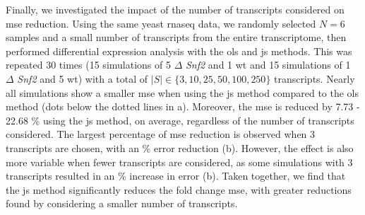 Finally, we investigated the impact of the number of transcripts considered on \gls{mse} reduction.
Using the same yeast \gls{rnaseq} data, we randomly selected $N = 6$ samples and a small number of transcripts from the entire transcriptome, then performed differential expression analysis with the \gls{ols} and \gls{js} methods.
This was repeated 30 times (15 simulations of 5 $\Delta$ \emph{Snf2} and 1 \gls{wt} and 15 simulations of 1 $\Delta$ \emph{Snf2} and 5 \gls{wt}) with a total of $|S| \in \{ 3, 10, 25, 50, 100, 250 \}$ transcripts.
Nearly all simulations show a smaller \gls{mse} when using the \gls{js} method compared to the \gls{ols} method (dots below the dotted lines in a).
Moreover, the \gls{mse} is reduced by 7.73 - 22.68 \% using the \gls{js} method, on average, regardless of the number of transcripts considered.
The largest percentage of \gls{mse} reduction is observed when 3 transcripts are chosen, with an  \% error reduction (b).
However, the effect is also more variable when fewer transcripts are considered, as some simulations with 3 transcripts resulted in an  \% increase in error (b).
Taken together, we find that the \gls{js} method significantly reduces the fold change \gls{mse}, with greater reductions found by considering a smaller number of transcripts.

